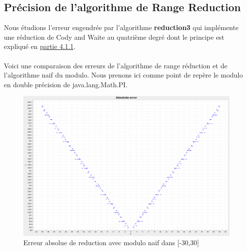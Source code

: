 \documentclass[12pt]{article}
\begin{document}
\subsection{Précision de l'algorithme de Range Reduction}

Nous étudions l'erreur engendrée par l'algorithme \textbf{reduction3} qui implémente
une réduction de Cody and Waite au quatrième degré dont le principe est expliqué en
\hyperref[sec:rangered]{partie 4.1.1}.\\
\\
Voici une comparaison des erreurs de l'algorithme de range réduction et
de l'algorithme naif du modulo. Nous prenons ici comme point de repère le modulo
en double précision de java.lang.Math.PI.

\begin{figure}[ht]
    \begin{center}
      \includegraphics[scale=0.28]{AbsoluteErrorNoRangeRed.png}
      \caption{Erreur absolue de reduction avec modulo naif dans [-30,30]}
      \label{Erreur absolue de reduction avec modulo naif}
    \end{center}
\end{figure}
\end{document}
